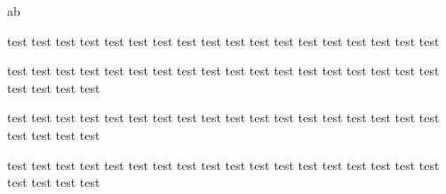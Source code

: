 ﻿\documentclass{ctexart}
\begin{document}
    a\hspace{2ex}b

    \hspace{5em}test test test test test test test test test test test test test test test test test test

    {\setlength{\fboxsep}{0pt}
    }

    test test test test test test test test test test test test test test test test test test test test test test 

    test test test test test test test test test test test test test test test test test test test test\hspace{5em} test test 

    test test test test test test test test test test test test test test test test test test test test\hspace*{5em} test test 
\end{document}
